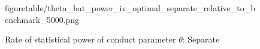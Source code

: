 \documentclass[11pt, a4paper]{article}
\begin{document}
\begin{figure}[!ht]
\begin{center}
{  {figuretable/theta_hat_power_iv_optimal_separate_relative_to_benchmark_5000.png}}
  \caption{Rate of statistical power of conduct parameter $\theta$: Separate}
  \label{fg:theta_hat_power_iv_polynomial_relative_to_benchmark}
  \end{center}
\end{figure} 
\end{document}
